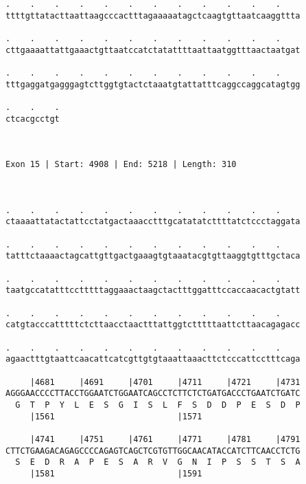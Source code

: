 \documentclass{article}
\begin{document}
\begin{Verbatim}
.    .    .    .    .    .    .    .    .    .    .    .    
ttttgttatacttaattaagcccactttagaaaaatagctcaagtgttaatcaaggttta
                                                            
.    .    .    .    .    .    .    .    .    .    .    .    
cttgaaaattattgaaactgttaatccatctatattttaattaatggtttaactaatgat
                                                            
.    .    .    .    .    .    .    .    .    .    .    .    
tttgaggatgagggagtcttggtgtactctaaatgtattatttcaggccaggcatagtgg
                                                            
.    .    .
ctcacgcctgt
           
           
 
Exon 15 | Start: 4908 | End: 5218 | Length: 310



.    .    .    .    .    .    .    .    .    .    .    .    
ctaaaattatactattcctatgactaaacctttgcatatatcttttatctccctaggata
                                                            
.    .    .    .    .    .    .    .    .    .    .    .    
tatttctaaaactagcattgttgactgaaagtgtaaatacgtgttaaggtgtttgctaca
                                                            
.    .    .    .    .    .    .    .    .    .    .    .    
taatgccatatttcctttttaggaaactaagctactttggatttccaccaacactgtatt
                                                            
.    .    .    .    .    .    .    .    .    .    .    .    
catgtacccatttttctcttaacctaactttattggtctttttaattcttaacagagacc
                                                            
.    .    .    .    .    .    .    .    .    .    .    .    
agaactttgtaattcaacattcatcgttgtgtaaattaaacttctcccattcctttcaga
                                                            
     |4681     |4691     |4701     |4711     |4721     |4731
AGGGAACCCCTTACCTGGAATCTGGAATCAGCCTCTTCTCTGATGACCCTGAATCTGATC
  G  T  P  Y  L  E  S  G  I  S  L  F  S  D  D  P  E  S  D  P
     |1561                         |1571                    
  
     |4741     |4751     |4761     |4771     |4781     |4791
CTTCTGAAGACAGAGCCCCAGAGTCAGCTCGTGTTGGCAACATACCATCTTCAACCTCTG
  S  E  D  R  A  P  E  S  A  R  V  G  N  I  P  S  S  T  S  A
     |1581                         |1591                    
  

\end{Verbatim}
\end{document}
